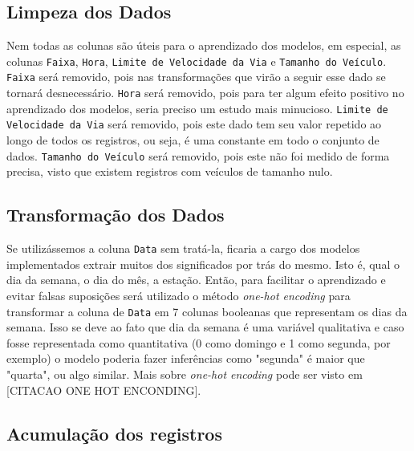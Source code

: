 \subsection{Limpeza dos Dados}

Nem todas as colunas são úteis para o aprendizado dos modelos, em especial, as colunas \texttt{Faixa}, \texttt{Hora}, \texttt{Limite de Velocidade da Via} e \texttt{Tamanho do Veículo}. \texttt{Faixa} será removido, pois nas transformações que virão a seguir esse dado se tornará desnecessário. \texttt{Hora} será removido, pois para ter algum efeito positivo no aprendizado dos modelos, seria preciso um estudo mais minucioso. \texttt{Limite de Velocidade da Via} será removido, pois este dado tem seu valor repetido ao longo de todos os registros, ou seja, é uma constante em todo o conjunto de dados. \texttt{Tamanho do Veículo} será removido, pois este não foi medido de forma precisa, visto que existem registros com veículos de tamanho nulo.


\subsection{Transformação dos Dados}



Se utilizássemos a coluna \texttt{Data} sem tratá-la, ficaria a cargo dos modelos implementados extrair muitos dos significados por trás do mesmo. Isto é, qual o dia da semana, o dia do mês, a estação. Então, para facilitar o aprendizado e evitar falsas suposições será utilizado o método \textit{one-hot encoding} para transformar a coluna de \texttt{Data} em 7 colunas booleanas que representam os dias da semana. Isso se deve ao fato que dia da semana é uma variável qualitativa e caso fosse representada como quantitativa (0 como domingo e 1 como segunda, por exemplo) o modelo poderia fazer inferências como "segunda" é maior que "quarta", ou algo similar. Mais sobre \textit{one-hot encoding} pode ser visto em [CITACAO ONE HOT ENCONDING].

\subsection{Acumulação dos registros}

